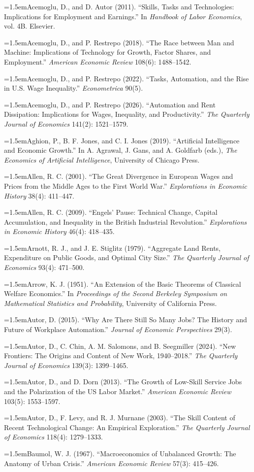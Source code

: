 \documentclass[12pt]{article}
\theoremstyle{plain}
\newcommand{\refentry}[1]{\par\hangindent=1.5em\hangafter=1\noindent #1}
\begin{document}
{\small\singlespacing
\refentry{Acemoglu, D., and D. Autor (2011). ``Skills, Tasks and Technologies: Implications for Employment and Earnings.'' In \emph{Handbook of Labor Economics}, vol. 4B. Elsevier.}
\refentry{Acemoglu, D., and P. Restrepo (2018). ``The Race between Man and Machine: Implications of Technology for Growth, Factor Shares, and Employment.'' \emph{American Economic Review} 108(6): 1488--1542.}
\refentry{Acemoglu, D., and P. Restrepo (2022). ``Tasks, Automation, and the Rise in U.S. Wage Inequality.'' \emph{Econometrica} 90(5).}
\refentry{Acemoglu, D., and P. Restrepo (2026). ``Automation and Rent Dissipation: Implications for Wages, Inequality, and Productivity.'' \emph{The Quarterly Journal of Economics} 141(2): 1521--1579.}
\refentry{Aghion, P., B. F. Jones, and C. I. Jones (2019). ``Artificial Intelligence and Economic Growth.'' In A. Agrawal, J. Gans, and A. Goldfarb (eds.), \emph{The Economics of Artificial Intelligence}, University of Chicago Press.}
\refentry{Allen, R. C. (2001). ``The Great Divergence in European Wages and Prices from the Middle Ages to the First World War.'' \emph{Explorations in Economic History} 38(4): 411--447.}
\refentry{Allen, R. C. (2009). ``Engels' Pause: Technical Change, Capital Accumulation, and Inequality in the British Industrial Revolution.'' \emph{Explorations in Economic History} 46(4): 418--435.}
\refentry{Arnott, R. J., and J. E. Stiglitz (1979). ``Aggregate Land Rents, Expenditure on Public Goods, and Optimal City Size.'' \emph{The Quarterly Journal of Economics} 93(4): 471--500.}
\refentry{Arrow, K. J. (1951). ``An Extension of the Basic Theorems of Classical Welfare Economics.'' In \emph{Proceedings of the Second Berkeley Symposium on Mathematical Statistics and Probability}, University of California Press.}
\refentry{Autor, D. (2015). ``Why Are There Still So Many Jobs? The History and Future of Workplace Automation.'' \emph{Journal of Economic Perspectives} 29(3).}
\refentry{Autor, D., C. Chin, A. M. Salomons, and B. Seegmiller (2024). ``New Frontiers: The Origins and Content of New Work, 1940--2018.'' \emph{The Quarterly Journal of Economics} 139(3): 1399--1465.}
\refentry{Autor, D., and D. Dorn (2013). ``The Growth of Low-Skill Service Jobs and the Polarization of the US Labor Market.'' \emph{American Economic Review} 103(5): 1553--1597.}
\refentry{Autor, D., F. Levy, and R. J. Murnane (2003). ``The Skill Content of Recent Technological Change: An Empirical Exploration.'' \emph{The Quarterly Journal of Economics} 118(4): 1279--1333.}
\refentry{Baumol, W. J. (1967). ``Macroeconomics of Unbalanced Growth: The Anatomy of Urban Crisis.'' \emph{American Economic Review} 57(3): 415--426.}
}
\end{document}
